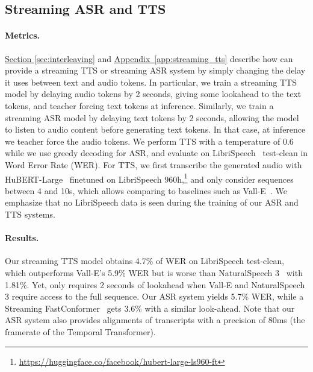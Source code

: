 \subsection{Streaming ASR and TTS}
\label{sec:streaming_asr_tts}
\paragraph{Metrics.} \hyperref[sec:interleaving]{Section \ref{sec:interleaving}} and \hyperref[app:streaming_tts]{Appendix~\ref{app:streaming_tts}} describe how \interleaving{} can provide a streaming TTS or streaming ASR system by simply changing the delay it uses between text and audio tokens. In particular, we train a streaming TTS model by delaying audio tokens by 2 seconds, giving some lookahead to the text tokens, and teacher forcing text tokens at inference. Similarly, we train a streaming ASR model by delaying text tokens by 2 seconds, allowing the model to listen to audio content before generating text tokens. In that case, at inference we teacher force the audio tokens. We perform TTS with a temperature of 0.6 while we use greedy decoding for ASR, and evaluate on LibriSpeech~\citep{librispeech} test-clean in Word Error Rate (WER). For TTS, we first transcribe the generated audio with HuBERT-Large~\citep{hubert} finetuned on LibriSpeech 960h,\footnote{\url{https://huggingface.co/facebook/hubert-large-ls960-ft}} and only consider sequences between 4 and 10s, which allows comparing to baselines such as Vall-E~\citep{valle}. We emphasize that no LibriSpeech data is seen during the training of our ASR and TTS systems.

\paragraph{Results.} Our streaming TTS model obtains 4.7\% of WER on LibriSpeech test-clean, which outperforms Vall-E's 5.9\% WER but is worse than NaturalSpeech 3~\citep{ju2024naturalspeech} with 1.81\%. Yet, \ours{} only requires 2 seconds of lookahead when Vall-E and NaturalSpeech 3 require access to the full sequence. Our ASR system yields 5.7\% WER, while a Streaming FastConformer~\citep{noroozi2024stateful} gets 3.6\% with a similar look-ahead. Note that our ASR system also provides alignments of transcripts with a precision of 80ms (the framerate of the Temporal Transformer).

